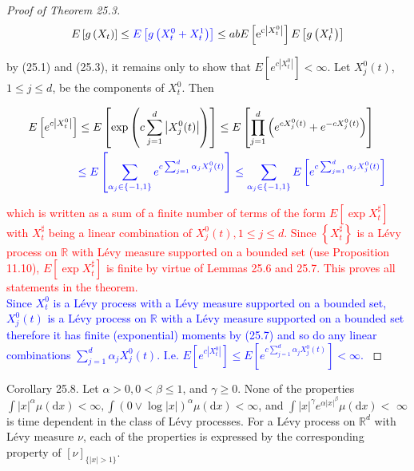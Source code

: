 \documentclass[a4paper,11pt]{article}
\begin{document}
\begin{proof}[Proof of Theorem 25.3]
    $$
        E\left[g\left(X_{t}\right)\right] \leq \textcolor{blue}{E\left[g\left(X_{t}^{0} + X_{t}^{1}\right)\right]}   \le a b E\left[\mathrm{e}^{\mathrm{c}\left|X_{t}^{0}\right|}\right] E\left[g\left(X_{t}^{1}\right)\right]
    $$

    by (25.1) and (25.3), it remains only to show that $E\left[e^{c |X_{t}^{0}| }\right]<\infty$.
    Let $X_{j}^{0}(t)$, $1 \leq j \leq d$, be the components of $X_{t}^{0}$. Then

    \begin{align*}
        E\left[e^{c\left|X_{t}^{0}\right|}\right] & \leq E\left[\exp \left(c \sum_{j=1}^{d}\left|X_{j}^{0}(t)\right|\right)\right] \leq E\left[\prod_{j=1}^{d}\left(e^{c X_{j}^{0}(t)}+e^{-c X_{j}^{0}(t)}\right)\right] \\
                                                  & \textcolor{blue}{
            \le  E \left[ \sum_{\alpha_{j} \in \{-1,1\}} e^{c \sum_{ j=1} ^{d} \alpha_{j} X^{0}_{j}(t)} \right]
            \le  \sum_{\alpha_{j} \in \{-1,1\}} E \left[e^{c \sum_{ j=1} ^{d} \alpha_{j} X^{0}_{j}(t)} \right]
        }
    \end{align*}

    \textcolor{red}{
        which is written as a sum of a finite number of terms of the form $E\left[\exp X_{t}^{\sharp}\right]$
        with $X_{t}^{\sharp}$ being a linear combination of $X_{j}^{0}(t), 1 \leq j \leq d$. Since $\left\{X_{t}^{\sharp}\right\}$
        is a Lévy process on $\mathbb{R}$ with Lévy measure supported on a bounded set (use Proposition 11.10),
        $E\left[\exp X_{t}^{\sharp}\right]$ is finite by virtue of Lemmas 25.6 and 25.7. This proves all statements in the theorem.\\
    }
    \textcolor{blue}{
    Since $X^{0}_{t}$ is a Lévy process with a Lévy measure supported on a bounded set,
    $X^{0}_{j}(t)$ is a Lévy process on $\mathbb{R}$ with a Lévy measure supported on a bounded set
    therefore it has finite (exponential) moments by (25.7) and so do any linear combinations $\sum_{j=1}^{d} \alpha_{j} X^{0}_{j}(t)$. I.e. $E\left[e^{c\left|X_{t}^{0}\right|}\right] \le  E \left[e^{c \sum_{ j=1} ^{d} \alpha_{j} X^{0}_{j}(t)} \right] <  \infty$.
    }
\end{proof}

Corollary 25.8. Let $\alpha>0,0<\beta \leq 1$, and $\gamma \geq 0$. None of the properties
$\int|x|^{\alpha} \mu(\mathrm{d} x)<\infty, \int(0 \vee \log |x|)^{\alpha} \mu(\mathrm{d} x)<\infty$, and
$\int|x|^{\gamma} e^{\alpha|x|^{\beta}} \mu(\mathrm{d} x)<$ $\infty$ is time dependent in the class
of Lévy processes. For a Lévy process on $\mathbb{R}^{d}$ with Lévy measure $\nu$, each of the properties
is expressed by the corresponding property of $[\nu]_{\{|x|>1\}}$.
\end{document}
